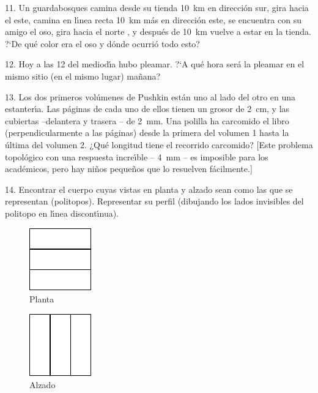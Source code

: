 \begin{problem}{11.}
	Un guardabosques camina desde su tienda \SI{10}{\km} en direcci\'on sur, gira hacia el este, camina en l\'{\i}nea recta
	\SI{10}{\km} m\'as en direcci\'on este, se encuentra con su amigo el oso, gira hacia el norte , y despu\'es de \SI{10}{\km} vuelve a
	estar en la tienda. ?`De qu\'e color era el oso y d\'onde ocurri\'o todo esto?
\end{problem}

\begin{problem}{12.}
	Hoy a las 12 del mediod\'{\i}a hubo pleamar. ?`A qu\'e hora ser\'a la pleamar en el mismo sitio (en el mismo lugar)
	ma\~nana?
\end{problem}

\begin{problem}{13.}
	Los dos primeros vol\'umenes de Pushkin est\'an uno al lado del otro en una estanter\'{\i}a.
	Las p\'aginas de cada uno de ellos tienen un grosor de \SI{2}{\cm}, y las cubiertas --delantera y trasera
	-- de \SI{2}{\mm}. Una polilla ha carcomido el libro (perpendicularmente a las p\'aginas) desde la primera del volumen 1 hasta
	la \'ultima del volumen 2. ¿Qu\'e longitud tiene el recorrido carcomido?
	[Este problema topol\'ogico con una respuesta incre\'{\i}ble -- \SI{4}{\mm} -- es imposible para los acad\'emicos,
	pero hay ni\~nos peque\~nos que lo resuelven f\'acilmente.]
\end{problem}

\begin{problem}{14.}
	Encontrar el cuerpo cuyas vistas en planta y alzado sean como las que se representan (politopos).
	Representar su perfil (dibujando los lados invisibles del politopo en l\'{\i}nea discont\'{\i}nua).
	\begin{figure}
		\footnotesize
		\null\hfill
		\parbox{0.2\linewidth}{\centering\includegraphics{resources/taskbook-99}\\Planta}
		\hfill
		\parbox{0.2\linewidth}{\centering\includegraphics{resources/taskbook-98}\\Alzado}
		\hfill\null
	\end{figure}
\end{problem}

